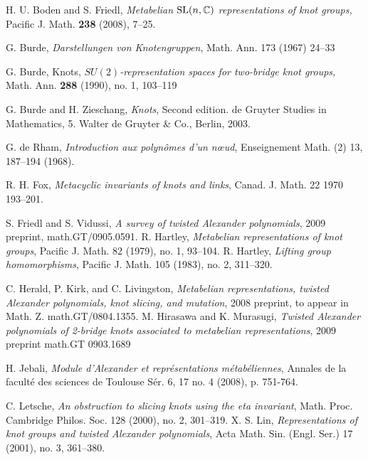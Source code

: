 \documentclass[12pt]{amsart}
\theoremstyle{plain}
\theoremstyle{remark}
\begin{document}
\begin{thebibliography}{100000}

H. U. Boden and S. Friedl,
{\em Metabelian ${{\rm SL}}(n,{{\mathbb C}})$ representations of knot groups,} Pacific J. Math.  {\bf 238} (2008), 7--25.

G. Burde,  {\em Darstellungen von Knotengruppen},  Math. Ann.  173  (1967) 24--33

G. Burde, {Knots,} {\em $SU(2)$-representation spaces for two-bridge knot groups,}
Math. Ann. {\bf 288} (1990), no. 1, 103--119

G. Burde and H. Zieschang, {\em Knots}, Second edition. de Gruyter Studies in Mathematics, 5. Walter de Gruyter \& Co., Berlin, 2003.

G. de Rham, {\em Introduction aux polyn\^omes d'un n{\oe}ud}, Enseignement Math. (2)  13, 187--194 (1968).

R. H. Fox, {\em Metacyclic invariants of knots and links},  Canad. J. Math.  22  1970 193--201.

 S. Friedl and S. Vidussi,
{\em A survey of twisted Alexander polynomials}, 2009 preprint, {math.GT/0905.0591}.
R. Hartley, {\em Metabelian representations of knot groups},  Pacific J. Math.  82  (1979), no. 1, 93--104.
R. Hartley, {\em Lifting group homomorphisms},  Pacific J. Math.  105  (1983), no. 2, 311--320.

C. Herald, P. Kirk, and C. Livingston,
{\em Metabelian representations, twisted Alexander polynomials, knot slicing,
and mutation},  2008 preprint, to appear in Math. Z.
{math.GT/0804.1355}.
M. Hirasawa and K. Murasugi, {\em  Twisted Alexander polynomials of 2-bridge knots associated to metabelian representations}, 2009 preprint {math.GT  0903.1689}

H. Jebali, {\em Module d'Alexander et repr\'esentations m\'etab\'eliennes}, Annales de la facult\'e des sciences de Toulouse S\'er. 6, 17 no. 4 (2008), p. 751-764.

C. Letsche, {\em An obstruction to slicing knots using the eta invariant},
Math. Proc. Cambridge Philos. Soc. 128 (2000), no. 2, 301--319.
X. S. Lin, {\em Representations of knot groups and twisted Alexander polynomials},  Acta Math. Sin. (Engl. Ser.)  17  (2001),  no. 3, 361--380.


\end{thebibliography}
\end{document}
